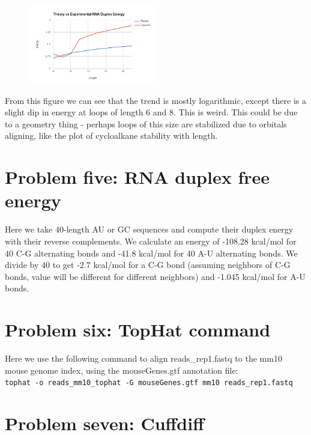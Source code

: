 \documentclass[10pt]{article} %
\begin{document}
\begin{figure}[h!]
  \caption{}
  \centering
  \includegraphics[width=0.5\textwidth]{../duplex_energy.png}
\end{figure}

From this figure we can see that the trend is mostly logarithmic, except there is a
slight dip in energy at loops of length 6 and 8. This is weird. This could be due to
a geometry thing - perhaps loops of this size are stabilized due to orbitals aligning,
like the plot of cycloalkane stability with length.\\

\section{Problem five: RNA duplex free energy}
Here we take 40-length AU or GC sequences and compute their duplex energy with their
reverse complements. We calculate an energy of -108.28 kcal/mol for 40 C-G alternating
bonds and -41.8 kcal/mol for 40 A-U alternating bonds. We divide by 40 to get -2.7
kcal/mol for a C-G bond (assuming neighbors of C-G bonds, value will be different
for different neighbors) and -1.045 kcal/mol for A-U bonds.\\

\section{Problem six: TopHat command}
Here we use the following command to align reads\_rep1.fastq to the mm10 mouse genome
index, using the mouseGenes.gtf annotation file:\\

\texttt{tophat -o reads\_mm10\_tophat
  -G mouseGenes.gtf mm10 reads\_rep1.fastq}

\section{Problem seven: Cuffdiff}
\end{document}

